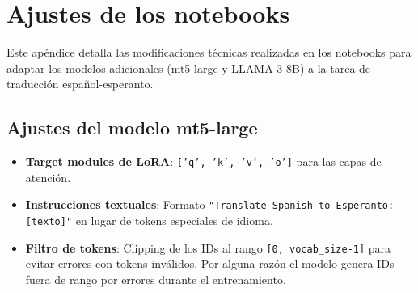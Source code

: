 \documentclass[11pt,spanish,listoffigures,listoftables]{tfgetsinf}
\begin{document}
\cleardoublepage
\printbibliography


\APPENDIX

\chapter{Ajustes de los notebooks}
\label{appendix:ajustes_notebooks}

Este apéndice detalla las modificaciones técnicas realizadas en los notebooks para adaptar los modelos adicionales (mt5-large y LLAMA-3-8B) a la tarea de traducción español-esperanto.

\section{Ajustes del modelo mt5-large}
\label{sec:ajustes_mt5}

\begin{itemize}
  \item \textbf{Target modules de LoRA}: \texttt{['q', 'k', 'v', 'o']} para las capas de atención.
  \item \textbf{Instrucciones textuales}: Formato \texttt{"Translate Spanish to Esperanto: [texto]"} en lugar de tokens especiales de idioma.
  \item \textbf{Filtro de tokens}: Clipping de los IDs al rango \texttt{[0, vocab\_size-1]} para evitar errores con tokens inválidos. Por alguna razón el modelo genera IDs fuera de rango por errores durante el entrenamiento.
\end{itemize}
\end{document}
